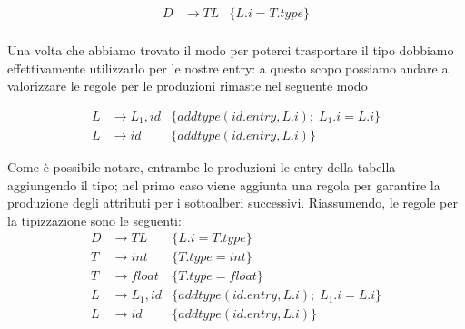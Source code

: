 \documentclass[class=book, crop=false, oneside, 12pt]{standalone}
\begin{document}
\begin{align*}
    D &\to TL &\{L.i = T.type\} \\
\end{align*}

Una volta che abbiamo trovato il modo per poterci trasportare il tipo dobbiamo effettivamente utilizzarlo per le nostre entry: a questo scopo possiamo andare a valorizzare le regole per le produzioni rimaste nel seguente modo

\begin{align*}
    L &\to L_1, id &\{addtype(id.entry, L.i);\; L_1.i = L.i\}\\
    L &\to id &\{addtype(id.entry, L.i)\}
\end{align*}

Come è possibile notare, entrambe le produzioni le entry della tabella aggiungendo il tipo; nel primo caso viene aggiunta una regola per garantire la produzione degli attributi per i sottoalberi successivi.  
Riassumendo, le regole per la tipizzazione sono le seguenti:
\begin{align*}
    D &\to TL &\{L.i = T.type\} \\
    T &\to int &\{T.type = int\} \\
    T &\to float &\{T.type = float\} \\
    L &\to L_1, id &\{addtype(id.entry, L.i);\; L_1.i = L.i\}\\
    L &\to id &\{addtype(id.entry, L.i)\}
\end{align*}
\end{document}
